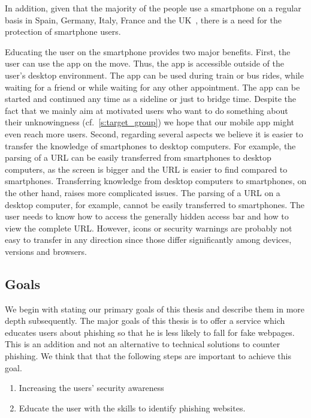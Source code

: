 \begin{description}[leftmargin=0cm]
	\item[High Number of Smartphone Users.] In addition, given that the majority of the people use a smartphone on a regular basis in Spain, Germany, Italy, France and the UK~\cite{smartphoneusage}, there is a need for the protection of smartphone users.
	\item[Benefits of Education on the Smartphone.] Educating the user on the smartphone provides two major benefits.
 First, the user can use the app on the move.
 Thus, the app is accessible outside of the user's desktop environment.
 The app can be used during train or bus rides, while waiting for a friend or while waiting for any other appointment.
 The app can be started and continued any time as a sideline or just to bridge time.
Despite the fact that we mainly aim at motivated users who want to do something about their unknowingness (cf.~\autoref{s:target_group}) we hope that our mobile app might even reach more users.
 Second, regarding several aspects we believe it is easier to transfer the knowledge of smartphones to desktop computers.
For example, the parsing of a URL can be easily transferred from smartphones to desktop computers, as the screen is bigger and the URL is easier to find compared to smartphones.
 Transferring knowledge from desktop computers to smartphones, on the other hand, raises more complicated issues.
The parsing of a URL on a desktop computer, for example, cannot be easily transferred to smartphones.
The user needs to know how to access the generally hidden access bar and how to view the complete URL.
However, icons or security warnings are probably not easy to transfer in any direction since those differ significantly among devices, versions and browsers.
\end{description} 
 
\subsection{Goals}
\label{s:goals}
We begin with stating our primary goals of this thesis and describe them in more depth subsequently.
The major goals of this thesis is to offer a service which educates users about phishing so that he is less likely to fall for fake webpages.
 This is an addition and not an alternative to technical solutions to counter phishing.
 We think that that the following steps are important to achieve this goal.


\begin{enumerate}
	\item Increasing the users' security awareness
	\item Educate the user with the skills to identify phishing websites.

\end{enumerate}

